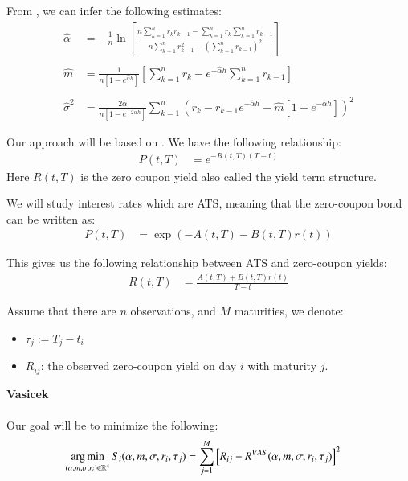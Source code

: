 \newpage
From \cite{Chalmers_MSc}, we can infer the following estimates: 
\begin{align*}
\hat{\alpha} &= 
-\frac{1}{n}\ln\left[
\frac{
n\sum_{k=1}^{n}r_{k}r_{k-1} - \sum_{k=1}^{n}r_{k}\sum_{k=1}^{n}r_{k-1}
}{
n\sum_{k=1}^{n}r_{k-1}^{2} - \left(\sum_{k=1}^{n}r_{k-1}\right)^{2}
}
\right] \\ 
\\ 
\hat{m} &= 
\frac{1}{n[1-e^{\hat{\alpha}h}]}
\left[
\sum_{k=1}^{n}r_{k} - e^{-\hat{\alpha}h}\sum_{k=1}^{n}r_{k-1}
\right] \\ 
\\ 
\hat{\sigma}^{2} &= 
\frac{
2\hat{\alpha}
}
{
n[1-e^{-2\hat{\alpha}h}]
}
\sum_{k=1}^{n}\left(
r_{k} - r_{k-1}e^{-\hat{\alpha}h} 
- \hat{m}[1-e^{-\hat{\alpha}h}]
\right)^{2}
\end{align*} 







\newpage 
Our approach will be based on \cite{halga2014}. We have the following relationship: 
\begin{align*}
P(t,T) &= e^{-R(t,T)(T-t)}
\end{align*}
Here $R(t,T)$ is the zero coupon yield also called the yield term structure. 


We will study interest rates which are ATS, meaning that the zero-coupon bond can be written as:
\begin{align*}
P(t,T) &= 
\exp\left(
-A(t,T) -B(t,T)r(t)
\right)
\end{align*}

This gives us the following relationship between ATS and zero-coupon yields: 
\begin{align*}
R(t,T) &= \frac{
A(t,T) + B(t,T)r(t)
}{
T-t
}    
\end{align*}

Assume that there are $n$ observations, and $M$ maturities, we denote: 
\begin{itemize}
    \item $\tau_{j} := T_{j} - t_{i}$
    \item $R_{ij}$: the observed zero-coupon yield on day $i$ with maturity $j$. 
\end{itemize}

\textbf{Vasicek}
\\~\\
Our goal will be to minimize the following: 
\begin{align*}
\operatorname*{arg\,min}\limits_{(\alpha, m, \sigma, r_{i}) \in \mathbb{R}^{4}}
S_{i}(\alpha, m, \sigma, r_{i}, \tau_{j}) 
&= 
\sum_{j=1}^{M}\left[
R_{ij} - R^{VAS}(\alpha, m, \sigma, r_{i}, \tau_{j})
\right]^{2}
\end{align*}

